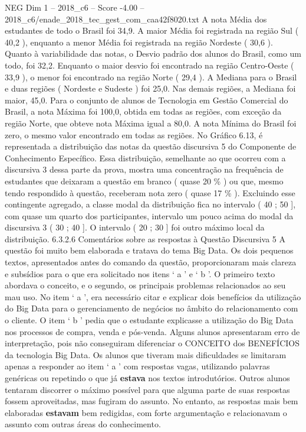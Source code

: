 \begin{textsample}{NEG Dim 1 – 2018\_c6 – Score -4.00 – 2018\_c6/enade\_2018\_tec\_gest\_com\_caa42f8020.txt}
A nota Média dos estudantes de todo o Brasil foi 34,9.
A maior Média foi registrada na região Sul ( 40,2 ), enquanto a menor Média foi registrada na região Nordeste ( 30,6 ).
Quanto à variabilidade das notas, o Desvio padrão dos alunos do Brasil, como um todo, foi 32,2.
Enquanto o maior desvio foi encontrado na região Centro-Oeste ( 33,9 ), o menor foi encontrado na região Norte ( 29,4 ).
A Mediana para o Brasil e duas regiões ( Nordeste e Sudeste ) foi 25,0.
Nas demais regiões, a Mediana foi maior, 45,0.
Para o conjunto de alunos de Tecnologia em Gestão Comercial do Brasil, a nota Máxima foi 100,0, obtida em todas as regiões, com exceção da região Norte, que obteve nota Máxima igual a 80,0.
A nota Mínima do Brasil foi zero, o mesmo valor encontrado em todas as regiões.
No Gráfico 6.13, é representada a distribuição das notas da questão discursiva 5 do Componente de Conhecimento Específico.
Essa distribuição, semelhante ao que ocorreu com a discursiva 3 dessa parte da prova, mostra uma concentração na frequência de estudantes que deixaram a questão em branco ( quase 20 \% ) ou que, mesmo tendo respondido à questão, receberam nota zero ( quase 17 \% ).
Excluindo esse contingente agregado, a classe modal da distribuição fica no intervalo ( 40 ; 50 ], com quase um quarto dos participantes, intervalo um pouco acima do modal da discursiva 3 ( 30 ; 40 ].
O intervalo ( 20 ; 30 ] foi outro máximo local da distribuição. 6.3.2.6 Comentários sobre as respostas à Questão Discursiva 5 A questão foi muito bem elaborada e tratava do tema Big Data.
Os dois pequenos textos, apresentados antes do comando da questão, proporcionaram mais clareza e subsídios para o que era solicitado nos itens ‘ a ’ e ‘ b ’.
O primeiro texto abordava o conceito, e o segundo, os principais problemas relacionados ao seu mau uso.
No item ‘ a ’, era necessário citar e explicar dois benefícios da utilização do Big Data para o gerenciamento de negócios no âmbito do relacionamento com o cliente.
O item ‘ b ’ pedia que o estudante explicasse a utilização do Big Data nos processos de compra, venda e pós-venda.
Alguns alunos apresentaram erro de interpretação, pois não conseguiram diferenciar o CONCEITO dos BENEFÍCIOS da tecnologia Big Data.
Os alunos que tiveram mais dificuldades se limitaram apenas a responder ao item ‘ a ’ com respostas vagas, utilizando palavras genéricas ou repetindo o que já \textbf{estava} nos textos introdutórios.
Outros alunos tentaram discorrer o máximo possível para que alguma parte de suas respostas fossem aproveitadas, mas fugiram do assunto.
No entanto, as respostas mais bem elaboradas \textbf{estavam} bem redigidas, com forte argumentação e relacionavam o assunto com outras áreas do conhecimento.

\end{textsample}
